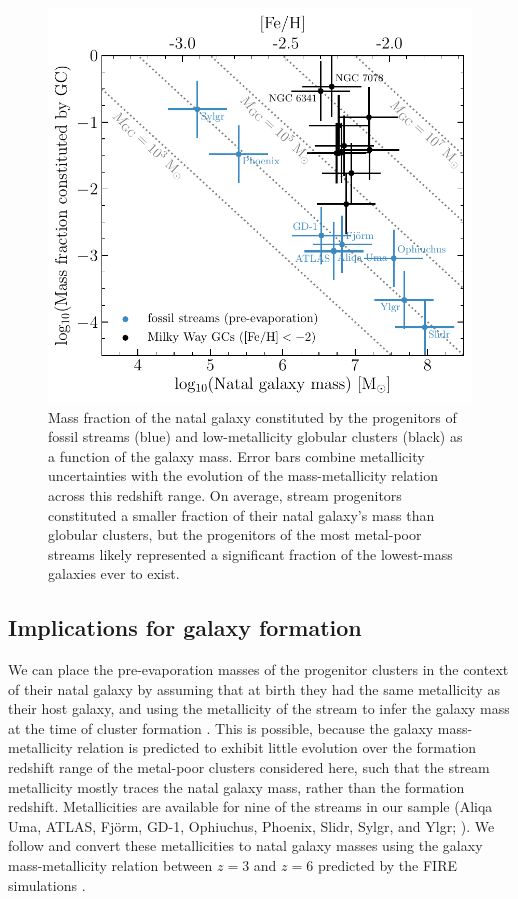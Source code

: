 \documentclass[twocolumn]{aastex63}
\begin{document}
\begin{figure}
\includegraphics[width=\hsize]{figures/mhost_fraction.pdf}
\caption{
\label{fig:mhost}
Mass fraction of the natal galaxy constituted by the progenitors of fossil streams (blue) and low-metallicity globular clusters (black) as a function of the galaxy mass.
Error bars combine metallicity uncertainties with the evolution of the mass-metallicity relation across this redshift range.
On average, stream progenitors constituted a smaller fraction of their natal galaxy's mass than globular clusters, but the progenitors of the most metal-poor streams likely represented a significant fraction of the lowest-mass galaxies ever to exist.
}
\end{figure}

\subsection{Implications for galaxy formation}
\label{sec:discuss_galform}
We can place the pre-evaporation masses of the progenitor clusters in the context of their natal galaxy by assuming that at birth they had the same metallicity as their host galaxy, and using the metallicity of the stream to infer the galaxy mass at the time of cluster formation \citep{kruijssen20b}. This is possible, because the galaxy mass-metallicity relation is predicted to exhibit little evolution over the formation redshift range of the metal-poor clusters considered here, such that the stream metallicity mostly traces the natal galaxy mass, rather than the formation redshift. Metallicities are available for nine of the streams in our sample (Aliqa Uma, ATLAS, Fj\"orm, GD-1, Ophiuchus, Phoenix, Slidr, Sylgr, and Ylgr; \citealt{ibata:2019,li:2020,wan20}). We follow \citet{kruijssen19c} and convert these metallicities to natal galaxy masses using the galaxy mass-metallicity relation between $z=3$ and $z=6$ predicted by the FIRE simulations \citep{ma16}.
\end{document}

